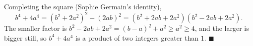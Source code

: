 Completing the square (Sophie Germain's identity),
\[b^4+4a^4=\left(b^2+2a^2\right)^2-(2ab)^2=\left(b^2+2ab+2a^2\right)\left(b^2-2ab+2a^2\right).\]
The smaller factor is $b^2-2ab+2a^2=(b-a)^2+a^2\ge a^2\ge4$, and the larger is bigger still, so $b^4+4a^4$ is a product of two integers greater than $1$. $\blacksquare$
